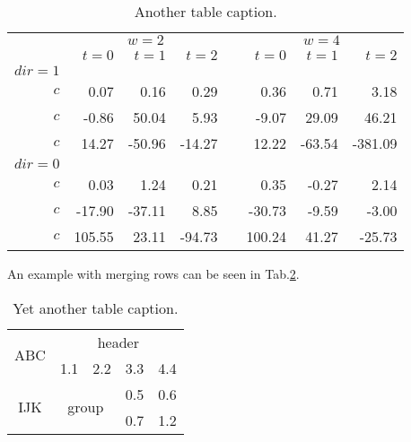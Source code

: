 \begin{table}[!htb]
  \centering
  \renewcommand{\arraystretch}{1.2} %
  \begin{tabular}{@{}rrrrcrrr@{}} %
    \toprule
      & \multicolumn{3}{c}{$w = 2$} & \phantom{abc} & \multicolumn{3}{c}{$w = 4$} \\
    \cmidrule{2-4}
    \cmidrule{6-8}
      & $t=0$ & $t=1$ & $t=2$ && $t=0$ & $t=1$ & $t=2$ \\
    \midrule
      $dir=1$
      \\
      $c$ &  0.07 &  0.16 &  0.29 &&  0.36 &  0.71 &   3.18 \\
      $c$ & -0.86 & 50.04 &  5.93 && -9.07 & 29.09 &  46.21 \\
      $c$ & 14.27 &-50.96 &-14.27 && 12.22 &-63.54 &-381.09 \\
      $dir=0$
      \\
      $c$ &  0.03 &  1.24 &  0.21 &&  0.35 & -0.27 &  2.14 \\
      $c$ &-17.90 &-37.11 &  8.85 &&-30.73 & -9.59 & -3.00 \\
      $c$ &105.55 & 23.11 &-94.73 &&100.24 & 41.27 &-25.73 \\
    \bottomrule
  \end{tabular}
  \caption{Another table caption.}
  \label{tab:multipleColumns}
\end{table}

An example with merging rows can be seen in Tab.\ref{tab:multipleRows}.

\begin{table}[!htb]
  \renewcommand{\arraystretch}{1.2} %
  \centering
  \begin{tabular}{ccccc}
    \toprule
      \multirow{2}{*}{ABC} & \multicolumn{4}{c}{header} \\
      \cmidrule{2-5} & 1.1 & 2.2 & 3.3 & 4.4 \\
    \midrule
      \multirow{2}{*}{IJK} & \multicolumn{2}{c}{\multirow{2}{*}{group}} & 0.5 & 0.6 \\
      \cmidrule{4-5}       & \multicolumn{2}{c}{}                       & 0.7 & 1.2 \\
    \bottomrule
  \end{tabular}
  \caption{Yet another table caption.}
  \label{tab:multipleRows}
\end{table}


